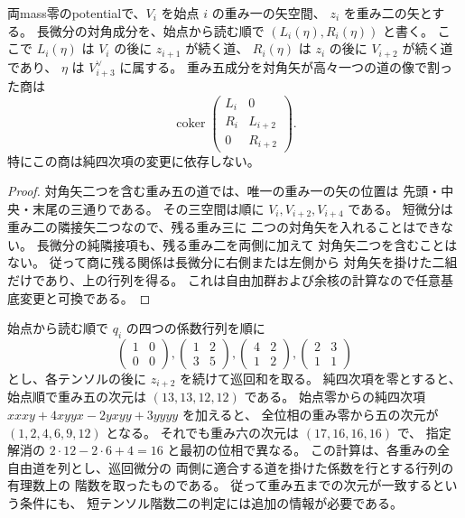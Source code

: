 \begin{proposition}[重み五の二対角成分]
\label{prop:qa-avatar-weight-five-diagonals}
両mass零のpotentialで、$V_i$ を始点 $i$ の重み一の矢空間、
$z_i$ を重み二の矢とする。
長微分の対角成分を、始点から読む順で
$(L_i(\eta),R_i(\eta))$ と書く。
ここで $L_i(\eta)$ は $V_i$ の後に $z_{i+1}$ が続く道、
$R_i(\eta)$ は $z_i$ の後に $V_{i+2}$ が続く道であり、
$\eta$ は $V_{i+3}^\vee$ に属する。
重み五成分を対角矢が高々一つの道の像で割った商は
\[
 \operatorname{coker}\!
 \begin{pmatrix}
 L_i&0\\
 R_i&L_{i+2}\\
 0&R_{i+2}
 \end{pmatrix}.
\]
特にこの商は純四次項の変更に依存しない。
\end{proposition}
\begin{proof}
対角矢二つを含む重み五の道では、唯一の重み一の矢の位置は
先頭・中央・末尾の三通りである。
その三空間は順に $V_i,V_{i+2},V_{i+4}$ である。
短微分は重み二の隣接矢二つなので、残る重み三に
二つの対角矢を入れることはできない。
長微分の純隣接項も、残る重み二を両側に加えて
対角矢二つを含むことはない。
従って商に残る関係は長微分に右側または左側から
対角矢を掛けた二組だけであり、上の行列を得る。
これは自由加群および余核の計算なので任意基底変更と可換である。
\end{proof}

\begin{example}[純四次項による重み五の次元の変化]
始点から読む順で $q_i$ の四つの係数行列を順に
\[
 \begin{pmatrix}1&0\\0&0\end{pmatrix}, \begin{pmatrix}1&2\\3&5\end{pmatrix}, \begin{pmatrix}4&2\\1&2\end{pmatrix}, \begin{pmatrix}2&3\\1&1\end{pmatrix}
\]
とし、各テンソルの後に $z_{i+2}$ を続けて巡回和を取る。
純四次項を零とすると、始点順で重み五の次元は
$(13,13,12,12)$ である。
始点零からの純四次項 $xxxy+4xyyx-2yxyy+3yyyy$ を加えると、
全位相の重み零から五の次元が $(1,2,4,6,9,12)$ となる。
それでも重み六の次元は $(17,16,16,16)$ で、
指定解消の $2\cdot12-2\cdot6+4=16$ と最初の位相で異なる。
この計算は、各重みの全自由道を列とし、巡回微分の
両側に適合する道を掛けた係数を行とする行列の有理数上の
階数を取ったものである。
従って重み五までの次元が一致するという条件にも、
短テンソル階数二の判定には追加の情報が必要である。
\end{example}


